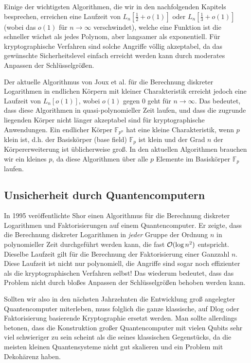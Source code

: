 \begin{refsegment}
Einige der wichtigsten Algorithmen, die wir in den nachfolgenden Kapitels besprechen, erreichen eine Laufzeit von $L_n[\frac 1 2 +o(1)]$ oder $L_n[\frac 1 3 +o(1)]$ (wobei das $o(1)$ für $n\to\infty$ verschwindet), welche eine Funktion ist die schneller wächst als jedes Polynom, aber langsamer als exponentiell. Für kryptographische Verfahren sind solche Angriffe völlig akzeptabel, da das gewünschte Sicherheitslevel einfach erreicht werden kann durch moderates Anpassen der Schlüsselgrößen.

Der aktuelle Algorithmus von Joux et al. für die Berechnung diskreter Logarithmen in endlichen Körpern mit kleiner Charakteristik erreicht jedoch eine Laufzeit von $L_n[o(1)]$, wobei $o(1)$ gegen $0$ geht für $n \to \infty$. Das bedeutet, dass diese Algorithmen in quasi-polynomieller Zeit laufen, und dass die zugrunde liegenden Körper nicht länger akzeptabel sind für kryptographische Anwendungen. Ein endlicher Körper $\mathbb{F}_{p^n}$ hat eine kleine Charakteristik, wenn $p$ klein ist, d.h. der Basiskörper (base field) $\mathbb{F}_p$ ist klein und der Grad $n$ der Körpererweiterung ist üblicherweise groß. In den aktuellen Algorithmen brauchen wir ein kleines $p$, da diese Algorithmen über alle $p$ Elemente im Basiskörper $\mathbb{F}_p$ laufen.


\subsection{Unsicherheit durch Quantencomputern}
In 1995 veröffentlichte Shor einen Algorithmus für die Berechnung diskreter Logarithmen und Faktorisierungen auf einem Quantencomputer. Er zeigte, dass die Berechnung diskreter Logarithmen in {\em jeder} Gruppe der Ordnung $n$ in polynomieller Zeit durchgeführt werden kann, die fast ${\cal O}(\log n^2)$ entspricht. Dieselbe Laufzeit gilt für die Berechnung der Faktorisierung einer Ganzzahl $n$. Diese Laufzeit ist nicht nur polynomiell, die Angriffe sind sogar noch effizienter als die kryptographischen Verfahren selbst! Das wiederum bedeutet, dass das Problem nicht durch bloßes Anpassen der Schlüsselgrößen behoben werden kann.

Sollten wir also in den nächsten Jahrzehnten die Entwicklung groß angelegter Quantencomputer miterleben, muss folglich die ganze klassische, auf Dlog oder Faktorisierung basierende Kryptographie ersetzt werden. Man sollte allerdings betonen, dass die Konstruktion großer Quantencomputer mit vielen Qubits sehr viel schwieriger zu sein scheint als die seines klassischen Gegenstücks, da die meisten kleinen Quantensysteme nicht gut skalieren und ein Problem mit Dekohärenz haben.\\[0.1cm]


\end{refsegment}
